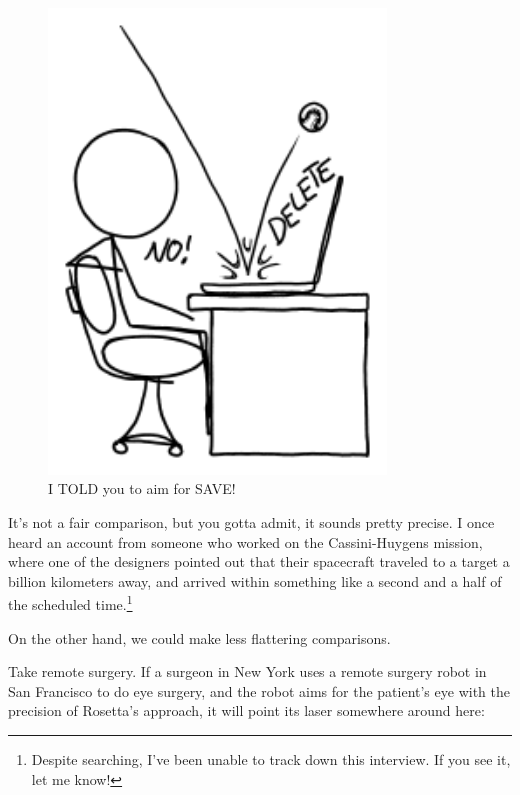 {\begin{figure}[!htbp]
\centering
\includegraphics[scale=0.5, max width=0.8\textwidth]{imgs/a/82/rosetta_send.png}
\caption{I TOLD you to aim for SAVE!}
\end{figure}

{It's not a fair comparison, but you gotta admit, it sounds pretty precise. I once heard an account from someone who worked on the Cassini-Huygens mission, where one of the designers pointed out that their spacecraft traveled to a target a billion kilometers away, and arrived within something like a second and a half of the scheduled time.{\footnote{Despite searching, I've been unable to track down this interview. If you see it, let me know!} } }

{On the other hand, we could make less flattering comparisons.}

{Take remote surgery. If a surgeon in New York uses a remote surgery robot in San Francisco to do eye surgery, and the robot aims for the patient's eye with the precision of Rosetta's approach, it will point its laser somewhere around here:}

}
